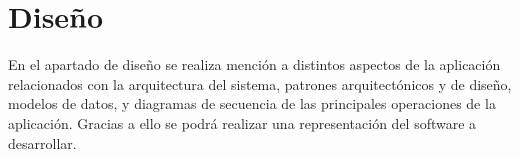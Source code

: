 \chapter{Diseño}

En el apartado de diseño se realiza mención a distintos aspectos de la aplicación relacionados con la arquitectura del sistema, patrones arquitectónicos y de diseño, modelos de datos, y diagramas de secuencia de las principales operaciones de la aplicación. Gracias a ello se podrá realizar una representación del software a desarrollar.




